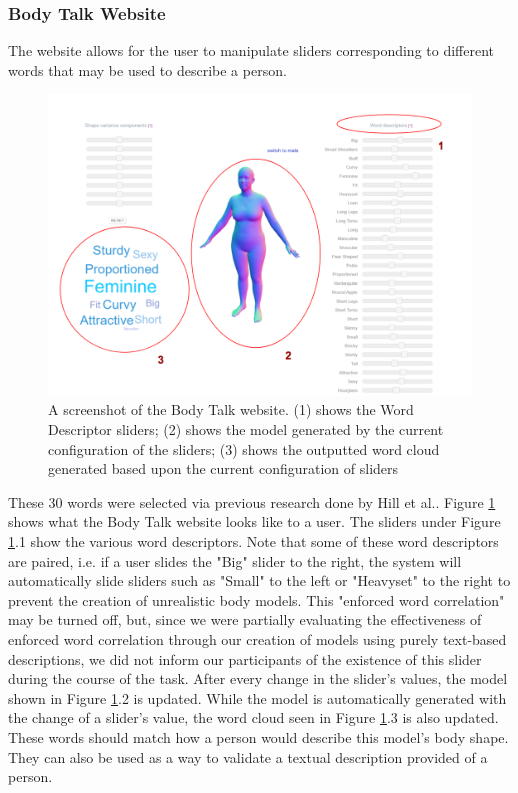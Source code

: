 \documentclass[journal]{vgtc}                %
\begin{document}
\subsubsection{Body Talk Website}
\noindent The website allows for the user to manipulate sliders corresponding to different words that may be used to describe a person.
\begin{figure} [!htb]
 \centering
  \includegraphics[width=\linewidth]{websiteUI}
  \caption{A screenshot of the Body Talk website. (1) shows the Word Descriptor sliders; (2) shows the model generated by the current configuration of
  the sliders; (3) shows the outputted word cloud generated based upon the current configuration of sliders}
  \label{fig:websiteUI}
\end{figure}
These 30 words were selected via previous research done by Hill et al.\cite{Hill:15}. Figure \ref{fig:websiteUI} shows what the Body Talk website
looks like to a user.
The sliders under Figure \ref{fig:websiteUI}.1 show the various word descriptors. Note that some of these word descriptors are paired, i.e.
if a user slides the "Big" slider to the right, the system will automatically slide sliders such as "Small" to the left or "Heavyset" to the right
to prevent the creation of unrealistic body models. This "enforced word correlation" may be turned off, but, since we were partially
evaluating the effectiveness of enforced word correlation through our creation of models using purely text-based descriptions, we did not inform our
participants of the existence of this slider during the course of the task. After every change in the slider's values, the model shown in Figure
\ref{fig:websiteUI}.2 is updated. While the model is automatically generated with the change of a slider's value, the word cloud seen in Figure
\ref{fig:websiteUI}.3 is also updated. These words should match how a person would describe this model's body shape. They can also be used as a way
to validate a textual description provided of a person.
\end{document}
